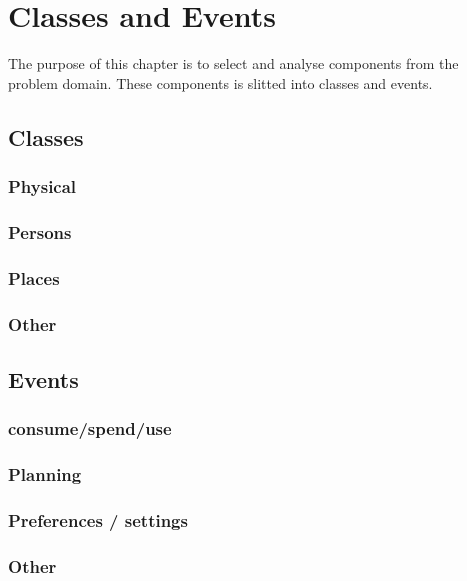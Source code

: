 \chapter{Classes and Events}
The purpose of this chapter is to select and analyse components from the problem domain. These components is slitted into classes and events.

\section{Classes}
\subsection{Physical}
\subsection{Persons}
\subsection{Places}
\subsection{Other}



\section{Events}
\subsection{consume/spend/use}
\subsection{Planning}
\subsection{Preferences / settings}
\subsection{Other}